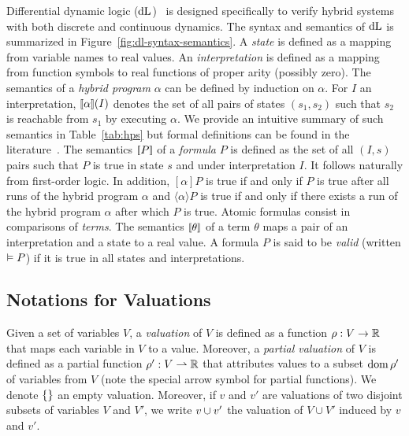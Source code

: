 \documentclass[acmsmall,screen,nonacm]{acmart}
\begin{document}


Differential dynamic logic ($\mathop{}\!\mathrm{d} \text{L}$)~\cite{DBLP:journals/jar/Platzer08,DBLP:journals/jar/Platzer17} is designed specifically to verify hybrid systems with both discrete and continuous dynamics.
The syntax and semantics of $\mathop{}\!\mathrm{d} \text{L}$ is summarized in Figure~\ref{fig:dl-syntax-semantics}. A \emph{state} is defined as a mapping from variable names to real values. An \emph{interpretation} is defined as a mapping from function symbols to real functions of proper arity (possibly zero). The semantics of a \emph{hybrid program} $\alpha$ can be defined by induction on $\alpha$. For $I$ an interpretation, $\sem{\alpha} (I)$ denotes the set of all pairs of states $(s_1, s_2)$ such that $s_2$ is reachable from $s_1$ by executing $\alpha$. We provide an intuitive summary of such semantics in Table~\ref{tab:hps} but formal definitions can be found in the literature~\cite{DBLP:journals/jar/Platzer17}. The semantics $\sem{P}$ of a \emph{formula} $P$ is defined as the set of all $(I, s)$ pairs such that $P$ is true in state $s$ and under interpretation $I$. It follows naturally from first-order logic. In addition, $[\alpha]P$ is true if and only if $P$ is true after all runs of the hybrid program $\alpha$ and $\langle \alpha \rangle P$ is true if and only if there exists a run of the hybrid program $\alpha$ after which $P$ is true. Atomic formulas consist in comparisons of \emph{terms}. The semantics $\sem{\theta}$ of a term $\theta$ maps a pair of an interpretation and a state to a real value. A formula $P$ is said to be \emph{valid} (written $\vDash P$) if it is true in all states and interpretations.

\subsection{Notations for Valuations}

Given a set of variables $V$, a \emph{valuation} of $V$ is defined as a function $\rho : V \to \mathbb{R}$ that maps each variable in $V$ to a value. Moreover, a \emph{partial valuation} of $V$ is defined as a {partial} function $\rho': V \rightharpoonup \mathbb{R}$ that attributes values to a subset $\operatorname{\text{dom}} \rho'$ of variables from $V$ (note the special arrow symbol for partial functions). We denote $\{\}$ an empty valuation. Moreover, if $v$ and $v'$ are valuations of two disjoint subsets of variables $V$ and $V'$, we write $v \cup v'$ the valuation of $V \cup V'$ induced by $v$ and $v'$.
\end{document}
